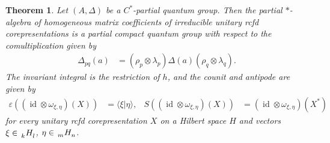 \documentclass[11pt]{article}
\DeclareMathOperator{\id}{id}
\newcommand{\Gr}[5]{\,\tensor*[^{#2}_{#4}]{#1}{^{#3}_{#5}}}%
\newcommand{\Grd}[3]{\Gr{#1}{}{}{#2}{#3}}
\newtheorem{Theorem}{Theorem}[section]
\theoremstyle{definition}
\numberwithin{equation}{section}
\begin{document}
\begin{Theorem} Let $(A,\Delta)$ be a $C^{*}$-partial quantum group.
  Then the partial $*$-algebra of homogeneous matrix coefficients of irreducible unitary rcfd
  corepresentations is a partial compact quantum group with respect to the comultiplication given by
  \begin{align} \label{eq:pcqg-comultiplication}
    \Delta_{pq}(a) &= (\rho_{p} \otimes \lambda_{p})\Delta(a)(\rho_{q}\otimes \lambda_{q}).
  \end{align}
  The invariant integral is the restriction of $h$, and the counit and antipode are given by
  \begin{align} \label{eq:pcqg-counit-antipode}
    \varepsilon((\id \otimes \omega_{\xi,\eta})(X)) &= \langle \xi|\eta\rangle, &
    S((\id \otimes \omega_{\xi,\eta})(X)) &= (\id \otimes \omega_{\xi,\eta})(X^{*})
  \end{align}
  for every unitary rcfd corepresentation $X$ on a Hilbert space $H$ and vectors $\xi \in
  \Grd{H}{k}{l}$, $\eta \in \Grd{H}{m}{n}$. 
\end{Theorem}
\end{document}
